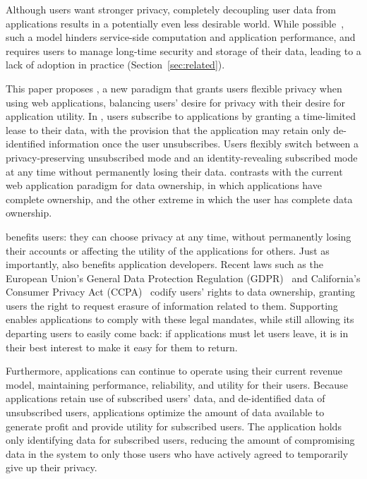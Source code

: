 Although users want stronger privacy, completely decoupling user data from applications results in a
potentially even less desirable world. While possible~\cite{solid, amber, w5, blockstack, bstore}, such a
model hinders service-side computation and application performance, and requires users to manage
long-time security and storage of their data, leading to a lack of adoption in practice (Section~\ref{sec:related}).  

This paper proposes \name, a new paradigm that grants users flexible privacy when using web
applications, balancing users' desire for privacy with their desire for application utility. In
\name, users subscribe to applications by granting a time-limited lease to their data, with the
provision that the application may retain only de-identified information once the user unsubscribes.
Users flexibly switch between a privacy-preserving unsubscribed mode and an identity-revealing
subscribed mode at any time without permanently losing their data. \name contrasts
with the current web application paradigm for data ownership, in which applications have complete
ownership, and the other extreme in which the user has complete data ownership.%

\name benefits users: they can choose privacy at any time, without
permanently losing their accounts or affecting the utility of the applications for others.  Just as
importantly, \name also benefits application developers. Recent laws such as the
European Union's General Data Protection Regulation (GDPR)~\cite{eu:gdpr} and California's Consumer
Privacy Act (CCPA)~\cite{ca:privacy-act} codify users' rights to data ownership, granting users the
right to request erasure of information related to them. Supporting \name enables
applications to comply with these legal mandates, while still allowing its departing users to easily
come back: if applications must let users leave, it is in their best interest to make it easy for
them to return.  

Furthermore, applications can continue to operate using their current revenue model, maintaining
performance, reliability, and utility for their users.  Because applications retain use of
subscribed users' data, and de-identified data of unsubscribed users, applications optimize the
amount of data available to generate profit and provide utility for subscribed users. The
application holds only identifying data for subscribed users, reducing the amount of
compromising data in the system to only those users who have actively agreed to temporarily give up
their privacy.


